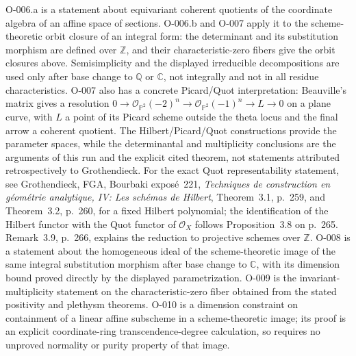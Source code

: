 O-006.a is a statement about equivariant coherent quotients of the
coordinate algebra of an affine space of sections. O-006.b and
O-007 apply it to the scheme-theoretic orbit closure of an integral
form: the determinant and its substitution morphism are defined
over $\mathbb Z$, and their characteristic-zero fibers give the
orbit closures above. Semisimplicity and the displayed irreducible
decompositions are used only after base change to $\mathbb Q$ or
$\mathbb C$, not integrally and not in all residue characteristics.
O-007 also has a concrete Picard/Quot interpretation: Beauville's
matrix gives a resolution
$0\to\mathcal O_{\mathbb P^2}(-2)^n\to
\mathcal O_{\mathbb P^2}(-1)^n\to L\to0$ on a plane curve,
with $L$ a point of its Picard scheme outside the theta locus and
the final arrow a coherent quotient. The Hilbert/Picard/Quot
constructions provide the parameter spaces, while the determinantal
and multiplicity conclusions are the arguments of this run and the
explicit cited theorem, not statements attributed retrospectively
to Grothendieck. For the exact Quot representability statement, see
Grothendieck, FGA, Bourbaki expos\'e~221, \emph{Techniques de
construction en g\'eom\'etrie analytique, IV: Les sch\'emas de Hilbert},
Theorem~3.1, p.~259, and Theorem~3.2, p.~260, for a fixed Hilbert
polynomial; the identification of the Hilbert functor with the Quot
functor of $\mathcal O_X$ follows Proposition~3.8 on p.~265.
Remark~3.9, p.~266, explains the reduction to projective schemes over
$\mathbb Z$. O-008 is a statement about the homogeneous ideal of the
scheme-theoretic image of the same integral substitution morphism
after base change to $\mathbb C$, with its dimension bound proved
directly by the displayed parametrization.
O-009 is the invariant-multiplicity statement on the characteristic-zero
fiber obtained from the stated positivity and plethysm theorems.
O-010 is a dimension constraint on containment of a linear affine
subscheme in a scheme-theoretic image; its proof is an explicit
coordinate-ring transcendence-degree calculation, so requires no
unproved normality or purity property of that image.

